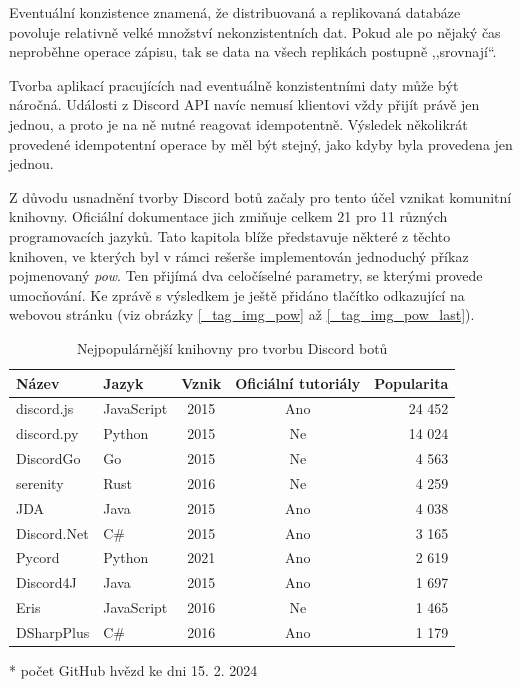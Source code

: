 \documentclass[FM]{tulthesis}
\begin{document}
	Eventuální konzistence znamená, že distribuovaná a replikovaná databáze povoluje relativně velké množství nekonzistentních dat. Pokud ale po nějaký čas neproběhne operace zápisu, tak se data na všech replikách postupně ,,srovnají``. \cite{book_distributedSystems4}
	
	Tvorba aplikací pracujících nad eventuálně konzistentními daty může být náročná. Události z Discord API navíc nemusí klientovi vždy přijít právě jen jednou, a proto je na ně nutné reagovat idempotentně. Výsledek několikrát provedené idempotentní operace by měl být stejný, jako kdyby byla provedena jen jednou. \cite{book_distributedSystemsUnderstanding}
	
	Z důvodu usnadnění tvorby Discord botů začaly pro tento účel vznikat komunitní knihovny. Oficiální dokumentace jich zmiňuje celkem 21 pro 11 různých programovacích jazyků. Tato kapitola blíže představuje některé z těchto knihoven, ve kterých byl v rámci rešerše implementován jednoduchý příkaz pojmenovaný \textit{pow}. Ten přijímá dva celočíselné parametry, se kterými provede umocňování. Ke zprávě s výsledkem je ještě přidáno tlačítko odkazující na webovou stránku (viz obrázky \ref{_tag_img_pow} až \ref{_tag_img_pow_last}).
	
	\begin{table}[ht]
		\centering
		\caption{Nejpopulárnější knihovny pro tvorbu Discord botů}\medskip
		\begin{threeparttable}
			\begin{tabular}{ l l c c r }
				\textbf{Název} & \textbf{Jazyk} & \textbf{Vznik} & \textbf{Oficiální tutoriály} & \textbf{Popularita}\tnote{*} \\\hline
				discord.js	& JavaScript & 2015 & Ano & 24 452 \\
				discord.py	& Python	 & 2015 & Ne  & 14 024 \\
				DiscordGo	& Go		 & 2015 & Ne  &  4 563 \\
				serenity	& Rust		 & 2016 & Ne  &  4 259 \\
				JDA			& Java		 & 2015 & Ano &  4 038 \\
				Discord.Net & C\#		 & 2015 & Ano &  3 165 \\
				Pycord		& Python	 & 2021 & Ano &  2 619 \\
				Discord4J	& Java		 & 2015 & Ano &  1 697 \\
				Eris		& JavaScript & 2016 & Ne  &  1 465 \\
				DSharpPlus	& C\#		 & 2016 & Ano &  1 179 \\
			\hline\end{tabular}
			\begin{tablenotes}
				\item[*] počet GitHub hvězd ke dni 15. 2. 2024
			\end{tablenotes}
		\end{threeparttable}
	\end{table}
	
\end{document}
